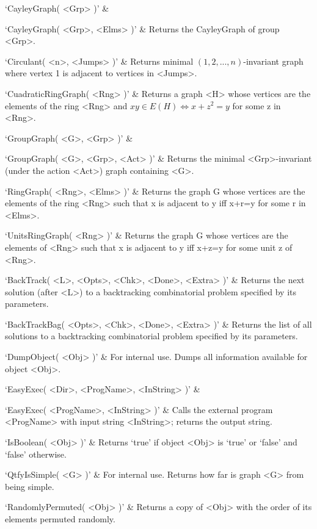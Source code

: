 \beginitems
`CayleyGraph( <Grp> )' & 

`CayleyGraph( <Grp>, <Elms> )' & 
Returns the CayleyGraph of group <Grp>.

`Circulant( <n>, <Jumps> )' & 
Returns minimal $(1, 2, ..., n)$-invariant graph where vertex 1 is adjacent to vertices in <Jumps>.

`CuadraticRingGraph( <Rng> )' & 
Returns a graph <H> whose vertices are the elements of the ring <Rng> and $xy\in E(H) \iff x+z^2=y$ for some z in <Rng>.

`GroupGraph( <G>, <Grp> )' & 

`GroupGraph( <G>, <Grp>, <Act> )' & 
Returns the minimal <Grp>-invariant (under the action <Act>) graph containing <G>.

`RingGraph( <Rng>, <Elms> )' & 
Returns  the  graph  G  whose  vertices are the elements of the ring <Rng>
such that x is adjacent to y iff x+r=y for some r in <Elms>.

`UnitsRingGraph( <Rng> )' & 
Returns  the graph G whose vertices are the elements of <Rng>  such that x
is adjacent to y iff x+z=y for some unit z of <Rng>.
\enditems


\beginitems
`BackTrack( <L>, <Opts>, <Chk>, <Done>, <Extra> )' & 
Returns the next solution (after <L>) to a backtracking combinatorial problem specified by its parameters.

`BackTrackBag( <Opts>, <Chk>, <Done>, <Extra> )' & 
Returns the list of all solutions to a backtracking combinatorial problem specified by its parameters.
\enditems


\beginitems
`DumpObject( <Obj> )' & 
For internal use. Dumps  all information available for object <Obj>.

`EasyExec( <Dir>, <ProgName>, <InString> )' & 

`EasyExec( <ProgName>, <InString> )' & 
Calls the external program <ProgName> with input string <InString>; returns the output string.

`IsBoolean( <Obj> )' & 
Returns `true' if object <Obj> is `true' or `false' and `false' otherwise.

`QtfyIsSimple( <G> )' & 
For internal use. Returns how far is graph <G> from being simple.

`RandomlyPermuted( <Obj> )' & 
Returns  a copy of <Obj> with the order of its elements permuted randomly.


